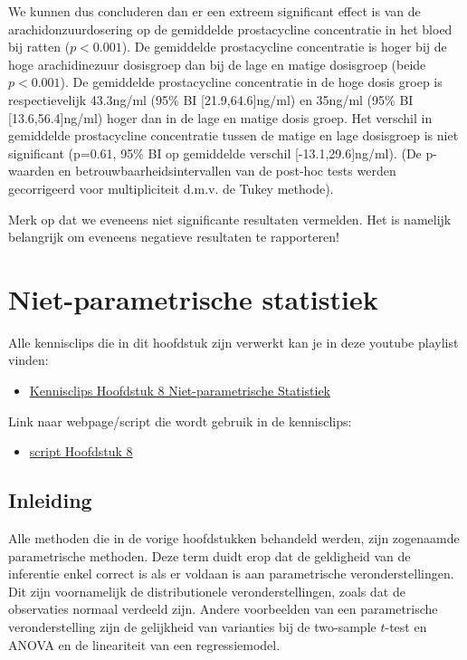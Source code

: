 \documentclass[
  12pt,dutch,coursenotes]{book}
\providecommand{\tightlist}{%
  \setlength{\itemsep}{0pt}\setlength{\parskip}{0pt}}
\begin{document}
We kunnen dus concluderen dan er een extreem significant effect is van de arachidonzuurdosering op de gemiddelde prostacycline concentratie in het bloed bij ratten (\(p<0.001\)).
De gemiddelde prostacycline concentratie is hoger bij de hoge arachidinezuur dosisgroep dan bij de lage en matige dosisgroep (beide \(p<0.001\)).
De gemiddelde prostacycline concentratie in de hoge dosis groep is respectievelijk 43.3ng/ml (95\% BI {[}21.9,64.6{]}ng/ml) en 35ng/ml (95\% BI {[}13.6,56.4{]}ng/ml) hoger dan in de lage en matige dosis groep.
Het verschil in gemiddelde prostacycline concentratie tussen de matige en lage dosisgroep is niet significant (p=0.61, 95\% BI op gemiddelde verschil {[}-13.1,29.6{]}ng/ml).
(De p-waarden en betrouwbaarheidsintervallen van de post-hoc tests werden gecorrigeerd voor multipliciteit d.m.v. de Tukey methode).

Merk op dat we eveneens niet significante resultaten vermelden. Het is namelijk belangrijk om eveneens negatieve resultaten te rapporteren!

\hypertarget{niet-parametrische-statistiek}{%
\chapter{Niet-parametrische statistiek}\label{niet-parametrische-statistiek}}

Alle kennisclips die in dit hoofdstuk zijn verwerkt kan je in deze youtube playlist vinden:

\begin{itemize}
\tightlist
\item
  \href{https://www.youtube.com/playlist?list=PLZH1hP8_LbJJyR4mqLOxDwwOzysbhaFm1}{Kennisclips Hoofdstuk 8 Niet-parametrische Statistiek}
\end{itemize}

Link naar webpage/script die wordt gebruik in de kennisclips:

\begin{itemize}
\tightlist
\item
  \href{https://statomics.github.io/sbc21/rmd/08-NonparametericStatistics.html}{script Hoofdstuk 8}
\end{itemize}

\hypertarget{inleiding-7}{%
\section{Inleiding}\label{inleiding-7}}

Alle methoden die in de vorige hoofdstukken behandeld werden, zijn zogenaamde parametrische methoden. Deze term duidt erop dat de geldigheid van de inferentie enkel correct is als er voldaan is aan parametrische veronderstellingen.
Dit zijn voornamelijk de distributionele veronderstellingen, zoals dat de observaties normaal verdeeld zijn. Andere
voorbeelden van een parametrische veronderstelling zijn de gelijkheid van varianties bij de two-sample \(t\)-test en ANOVA en de lineariteit van een regressiemodel.
\end{document}
